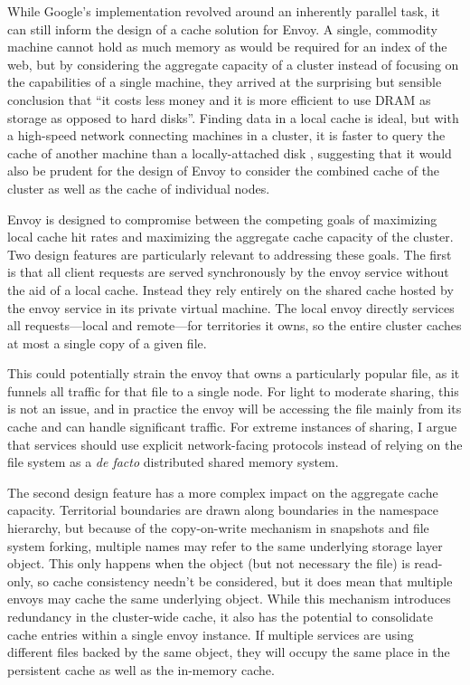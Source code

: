 While Google's implementation revolved around an inherently parallel task, it can still inform the design of a cache solution for Envoy. A single, commodity machine cannot hold as much memory as would be required for an index of the web, but by considering the aggregate capacity of a cluster instead of focusing on the capabilities of a single machine, they arrived at the surprising but sensible conclusion that ``it costs less money and it is more efficient to use DRAM as storage as opposed to hard disks''. Finding data in a local cache is ideal, but with a high-speed network connecting machines in a cluster, it is faster to query the cache of another machine than a locally-attached disk \cite{dahlin94b}, suggesting that it would also be prudent for the design of Envoy to consider the combined cache of the cluster as well as the cache of individual nodes.

Envoy is designed to compromise between the competing goals of maximizing local cache hit rates and maximizing the aggregate cache capacity of the cluster. Two design features are particularly relevant to addressing these goals. The first is that all client requests are served synchronously by the envoy service without the aid of a local cache. Instead they rely entirely on the shared cache hosted by the envoy service in its private virtual machine. The local envoy directly services all requests---local and remote---for territories it owns, so the entire cluster caches at most a single copy of a given file.

This could potentially strain the envoy that owns a particularly popular file, as it funnels all traffic for that file to a single node. For light to moderate sharing, this is not an issue, and in practice the envoy will be accessing the file mainly from its cache and can handle significant traffic. For extreme instances of sharing, I argue that services should use explicit network-facing protocols instead of relying on the file system as a \emph{de facto} distributed shared memory system.

The second design feature has a more complex impact on the aggregate cache capacity. Territorial boundaries are drawn along boundaries in the namespace hierarchy, but because of the copy-on-write mechanism in snapshots and file system forking, multiple names may refer to the same underlying storage layer object. This only happens when the object (but not necessary the file) is read-only, so cache consistency needn't be considered, but it does mean that multiple envoys may cache the same underlying object. While this mechanism introduces redundancy in the cluster-wide cache, it also has the potential to consolidate cache entries within a single envoy instance. If multiple services are using different files backed by the same object, they will occupy the same place in the persistent cache as well as the in-memory cache.

